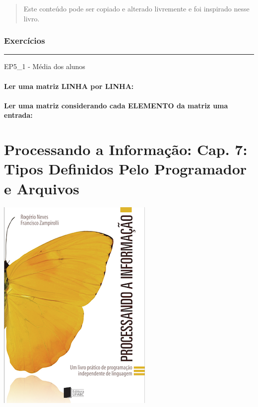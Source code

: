 \documentclass[12pt,a4paper]{article}
\begin{document}
\begin{quote}
Este conteúdo pode ser copiado e alterado livremente e foi inspirado
nesse livro.
\end{quote}

    \hypertarget{exercuxedcios}{%
\subsubsection{Exercícios}\label{exercuxedcios}}

    \begin{center}\rule{0.5\linewidth}{0.5pt}\end{center}

EP5\_1 - Média dos alunos

    \hypertarget{ler-uma-matriz-linha-por-linha}{%
\paragraph{Ler uma matriz LINHA por
LINHA:}\label{ler-uma-matriz-linha-por-linha}}

    \hypertarget{ler-uma-matriz-considerando-cada-elemento-da-matriz-uma-entrada}{%
\paragraph{Ler uma matriz considerando cada ELEMENTO da matriz uma
entrada:}\label{ler-uma-matriz-considerando-cada-elemento-da-matriz-uma-entrada}}

    \hypertarget{processando-a-informauxe7uxe3o-cap.-7-tipos-definidos-pelo-programador-e-arquivos}{%
\section{Processando a Informação: Cap. 7: Tipos Definidos Pelo
Programador e
Arquivos}\label{processando-a-informauxe7uxe3o-cap.-7-tipos-definidos-pelo-programador-e-arquivos}}

    \includegraphics{"figs/Capa_Processando_Informacao.jpg"}
\end{document}
